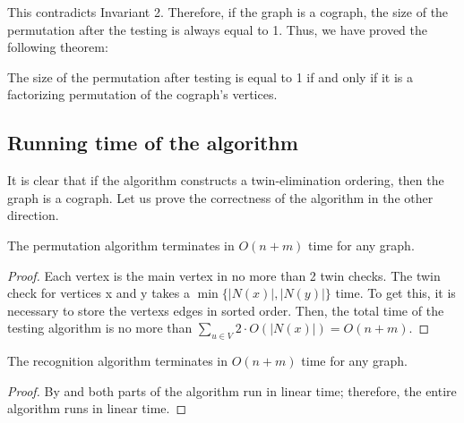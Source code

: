 This contradicts Invariant 2. Therefore, if the graph is a cograph, the size of the permutation after the testing is always equal to 1. 
Thus, we have proved the following theorem:

\begin{theorem}
    The size of the permutation after testing is equal to 1 if and only if it is a factorizing permutation of the cograph's vertices.
\end{theorem}

\subsection{Running time of the algorithm}

It is clear that if the algorithm constructs a twin-elimination ordering, then the graph is a cograph. Let us prove the correctness of the algorithm in the other direction.

\begin{theorem}
    The permutation algorithm terminates in $O(n+m)$ time for any graph.
    \label{Running time of the permutation verification algorithm}
\end{theorem}

\begin{proof}
Each vertex is the main vertex in no more than 2 twin checks. The twin check for vertices x and y takes a $\min\{|N(x)|,|N(y)|\} $ time. To get this, it is necessary to store the vertexs edges in sorted order. Then, the total time of the testing algorithm is no more than $\sum\limits_{u \in V} 2 \cdot O(|N(x)|) = O(n+m)$.
\end{proof}

\begin{theorem}
    The recognition algorithm terminates in $O(n+m)$ time for any graph.
\end{theorem}
\begin{proof}
By  and  both parts of the algorithm run in linear time; therefore, the entire algorithm runs in linear time.
\end{proof}